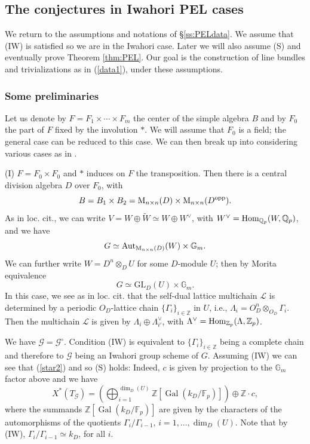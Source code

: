 \documentclass[reqno, 10pt]{amsart}
\newcommand{\BF}{\ensuremath{\mathbb {F}}\xspace}
\newcommand{\BG}{\ensuremath{\mathbb {G}}\xspace}
\newcommand{\BQ}{\ensuremath{\mathbb {Q}}\xspace}
\newcommand{\BZ}{\ensuremath{\mathbb {Z}}\xspace}
\newcommand{\CG}{\ensuremath{\mathcal {G}}\xspace}
\newcommand{\RM}{\ensuremath{\mathrm {M}}\xspace}
\DeclareMathOperator{\Gal}{Gal}
\newcommand{\GL}{\mathrm{GL}}
\theoremstyle{definition}
\numberwithin{equation}{subsection}
\numberwithin{subsubsection}{subsection}
\begin{document}
  
 \subsection{The conjectures   in Iwahori  PEL cases}\label{ss:ConjPEL}
 
 We return to the assumptions and notations of \S \ref{ss:PELdata}. We assume that (IW) is satisfied so we are in the Iwahori case. Later we will also assume (S) and eventually prove Theorem \ref{thm:PEL}. Our goal is the construction of line bundles and trivializations as in (\ref{data1}), under these assumptions. 
 
 \subsubsection{Some preliminaries}\label{sss:prelim} Let us denote by $F=F_1\times\cdots\times F_m$ the center of the simple algebra $B$ and by $F_0$ the part of $F$ fixed by the involution $*$. We will assume that $F_0$ is a field; the general case can be reduced to this case. We can then break up into considering various cases as in \cite[p. 135]{RZbook}. 
 \medskip
 
 (I) $F=F_0\times F_0$ and $*$ induces on $F$ the transposition. Then there is a central division algebra $D$ over $F_0$, with
 \[
 B=B_1\times B_2=\RM_{n\times n}(D)\times \RM_{n\times n}(D^{\rm opp}).
 \]
As in loc. cit., we can write $V=W\oplus \widetilde W\simeq W\oplus W^\vee$, with $W^\vee={\rm Hom}_{\BQ_p}(W,\BQ_p)$, and we have
 \[
G\simeq {\rm Aut}_{\RM_{n\times n}(D)}(W)\times \BG_m.
\]
 We can further write $W=D^n\otimes_D U$ for some $D$-module $U$; then by Morita equivalence
 \[
 G\simeq \GL_{D}(U)\times \BG_m.
 \]
 In this case, we see as in loc. cit. that the self-dual lattice multichain $\mathscr L$ is determined by a periodic $O_D$-lattice chain 
 $\{\Gamma_i\}_{i\in \BZ}$ in $U$, i.e., $\Lambda_i=O_D^n\otimes_{O_D}\Gamma_i$. Then the multichain $\mathscr L$ is given by $\Lambda_i\oplus \Lambda^\vee_{i'}$, with $\Lambda^\vee={\rm Hom}_{\BZ_p}(\Lambda, \BZ_p)$. 
 
 We have $\CG=\CG^\circ$. Condition (IW) is equivalent to $\{\Gamma_i\}_{i\in \BZ}$ being a complete chain and therefore to $\CG$ being an Iwahori group scheme of $G$. Assuming (IW) we can see that (\ref{star2}) and so (S) holds:
 Indeed, $c$ is given by projection to the $\BG_m$ factor above and we have
 \[
 X^*(T_\CG)=(\bigoplus_{i=1}^{\dim_D(U)} \BZ[\Gal(k_D/\BF_p)])\oplus \BZ\cdot c, 
 \]
where the summands $\BZ[\Gal(k_D/\BF_p)]$ are given by the characters of the automorphisms of the quotients $\Gamma_i/\Gamma_{i-1}$, $i=1,\ldots, \dim_D(U)$. Note that by (IW), $\Gamma_i/\Gamma_{i-1}\simeq k_D$, for all $i$.
\medskip
\end{document}
